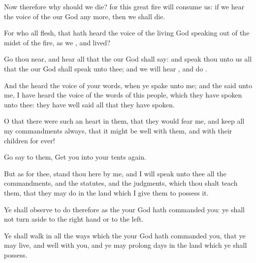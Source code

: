 {Now therefore why should we
die? for this
great
fire will
consume us: if we
hear the
voice of the
{} our
God any
more, then we shall
die.

For who
{} all
flesh, that hath
heard the
voice of the
living
God
speaking out of the
midst of the
fire, as we
{}, and
lived?

Go thou
near, and
hear all that the
{} our
God shall
say: and
speak thou unto us all that the
{} our
God shall
speak unto thee; and we will
hear
{}, and
do
{}.

And the
{}
heard the
voice of your
words, when ye
spake unto me; and the
{}
said unto me, I have
heard the
voice of the
words of this
people, which they have
spoken unto thee: they have
well said all that they have
spoken.

O that there were
such
an
heart in
them, that they would
fear me, and
keep all my
commandments
always, that it might be
well with them, and with their
children for
ever!

Go
say to them,
Get you into your
tents
again.

But as for thee,
stand thou here by
me, and I will
speak unto thee all the
commandments, and the
statutes, and the
judgments, which thou shalt
teach them, that they may
do
{} in the
land which I
give them to
possess it.

Ye shall
observe to
do therefore as the
{} your
God hath
commanded you: ye shall not turn
aside to the right
hand or to the
left.

Ye shall
walk in all the
ways which the
{} your
God hath
commanded you, that ye may
live, and
{}
well with you, and
{} ye may
prolong
{}
days in the
land which ye shall
possess.




\par }
